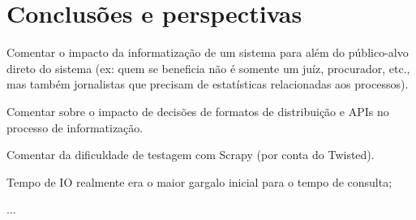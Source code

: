 \chapter{Conclusões e perspectivas~\label{chp:conclusions}}


\begin{todolist}
    \item Comentar o impacto da informatização de um sistema para além do
          público-alvo direto do sistema (ex: quem se beneficia não é somente
          um juíz, procurador, etc., mas também jornalistas que precisam de
          estatísticas relacionadas aos processos).
    \item Comentar sobre o impacto de decisões de formatos de distribuição e
          APIs no processo de informatização.
\end{todolist}

\begin{todolist}
    \item Comentar da dificuldade de testagem com Scrapy (por conta do Twisted).
\end{todolist}

\begin{todolist}
    \item Tempo de IO realmente era o maior gargalo inicial para o tempo de consulta;
    \item ...
\end{todolist}
